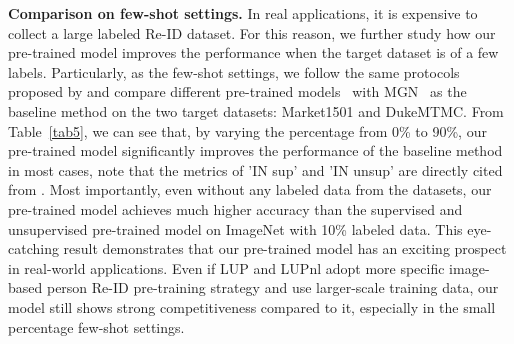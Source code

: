\documentclass[10pt,twocolumn,letterpaper]{article}
\begin{document}
\noindent\textbf{Comparison on few-shot settings.} In real applications, it is expensive to collect a large labeled Re-ID dataset. For this reason, we further study how our pre-trained model improves the performance when the target dataset is of a few labels. Particularly, as the few-shot settings, we follow the same protocols proposed by \cite{LUP} and compare different pre-trained models~\cite{resnet,mocov2,LUP,LUPnl} with MGN~\cite{MGN} as the baseline method on the two target datasets: Market1501 and DukeMTMC. From Table~\ref{tab5}, we can see that, by varying the percentage from 0\% to 90\%, our pre-trained model significantly improves the performance of the baseline method in most cases, note that the metrics of 'IN sup' and 'IN unsup' are directly cited from \cite{LUPnl}. Most importantly, even without any labeled data from the datasets, our pre-trained model achieves much higher accuracy than the supervised and unsupervised pre-trained model on ImageNet with 10\% labeled data. This eye-catching result demonstrates that our pre-trained model has an exciting prospect in real-world applications. Even if LUP and LUPnl adopt more specific image-based person Re-ID pre-training strategy and use larger-scale training data, our model still shows strong competitiveness compared to it, especially in the small percentage few-shot settings.
\end{document}
